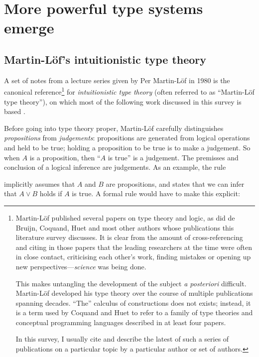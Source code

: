 \documentclass[12pt,toc=bibliography,numbers=noendperiod,
               footnotes=multiple,twoside]{scrartcl}
\begin{document}
\section{More powerful type systems emerge}

\subsection{Martin-Löf's intuitionistic type theory}

A set of notes from a lecture series given by Per Martin-Löf in 1980 is the canonical reference\footnote{%
Martin-Löf published several papers on type theory and logic, as did de Bruijn, Coquand, Huet and most other authors whose publications this literature survey discusses. It is clear from the amount of cross-referencing and citing in those papers that the leading researchers at the time were often in close contact, criticising each other's work, finding mistakes or opening up new perspectives---\emph{science} was being done.

This makes untangling the development of the subject \emph{a posteriori} difficult. Martin-Löf developed his type theory over the course of multiple publications spanning decades. \enquote{The} calculus of constructions does not exists; instead, it is a term used by Coquand and Huet to refer to a family of type theories and conceptual programming languages described in at least four papers.

In this survey, I usually cite and describe the latest of such a series of publications on a particular topic by a particular author or set of authors.}
%
for \emph{intuitionistic type theory} (often referred to as \enquote{Martin-Löf type theory}), on which most of the following work discussed in this survey is based \autocite{sambin_intuitionistic_1984}.

Before going into type theory proper, Martin-Löf carefully distinguishes \emph{propositions} from \emph{judgements}: propositions are generated from logical operations and held to be true; holding a proposition to be true is to make a judgement. So when \(A\) is a proposition, then \enquote{\(A\) is true} is a judgement. The premisses and conclusion of a logical inference are judgements. As an example, the rule

\begin{prooftree}
\end{prooftree}

implicitly assumes that \(A\) and \(B\) are propositions, and states that we can infer that \(A \vee B\) holds if \(A\) is true. A formal rule would have to make this explicit:
\end{document}
